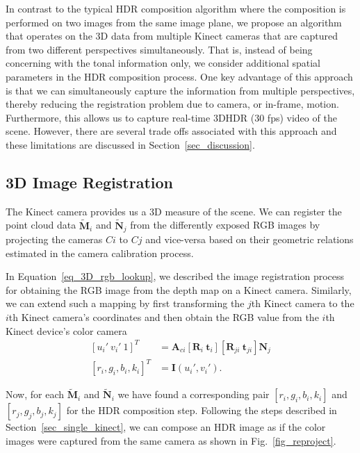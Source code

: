 In contrast to the typical HDR composition algorithm where the composition is performed on two images from the same image plane, we propose an algorithm that operates on the 3D data from multiple Kinect cameras that are captured from two different perspectives simultaneously. That is, instead of being concerning with the tonal information only, we consider additional spatial parameters in the HDR composition process.  One key advantage of this approach is that we can simultaneously capture the information from multiple perspectives, thereby reducing the registration problem due to camera, or in-frame, motion. Furthermore, this allows us to capture real-time 3DHDR (30 fps) video of the scene. However, there are several trade offs associated with this approach and these limitations are discussed in Section~\ref{sec_discussion}.

\subsection{3D Image Registration}
The Kinect camera provides us a 3D measure of the scene. We can register the point cloud data $\mathbf{\tilde{M}}_{i}$ and $\mathbf{\tilde{N}}_{j}$
 from the differently exposed RGB images by projecting the cameras $Ci$ to $Cj$ and vice-versa based on their geometric relations estimated in the camera calibration process.

In Equation~\ref{eq_3D_rgb_lookup}, we described the image registration process for obtaining the RGB image from the depth map on a Kinect camera. Similarly, we can extend such a mapping by first transforming the $j$th Kinect camera to the $i$th Kinect camera's coordinates and then obtain the RGB value from the $i$th Kinect device's color camera 
\begin{equation}
\begin{split}
[u_i'~v_i'~1]^T &=  \mathbf{A}_{ci}[\mathbf{R}_i~\mathbf{t}_i][\mathbf{R}_{ji}~\mathbf{t}_{ji}]\mathbf{N}_j\\
[r_i, g_i, b_i, k_i]^T &= \mathbf{I}(u_i', v_i').
\label{eq_3D_rgb_lookup_ir}
\end{split}
\end{equation}

Now, for each $\mathbf{\tilde{M}}_{i}$ and $\mathbf{\tilde{N}}_{i}$ we have found a corresponding pair $[r_i, g_i, b_i, k_i]$ and $[r_j, g_j, b_j, k_j]$ for the HDR composition step.  Following the steps described in Section~\ref{sec_single_kinect}, we can compose an HDR image as if the color images were captured from the same camera as shown in Fig.~\ref{fig_reproject}.

